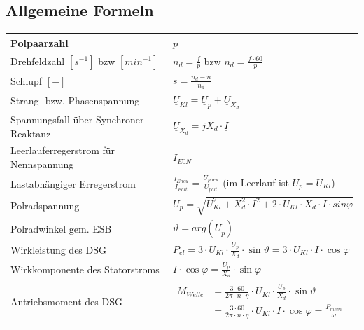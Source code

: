     \subsection{Allgemeine Formeln}
    \begin{tabular}[c]{ | p{7cm} | p{8cm} |}
    	\hline
    	Polpaarzahl	& $p$\\
    	\hline
    	Drehfeldzahl $[s^{-1}]$ bzw $[min^{-1}]$ & $n_d=\frac{f}{p}$ bzw
    	$n_d=\frac{f\cdot 60}{p}$\\
    	\hline
    	Schlupf $[-]$ & $s=\frac{n_d-n}{n_d}$\\
    	\hline
    	Strang- bzw. Phasenspannung &
    	$\underline{U}_{Kl}=\underline{U}_p+\underline{U}_{X_d}$\\
    	\hline
    	Spannungsfall über Synchroner Reaktanz & $\underline{U}_{X_d}=jX_d\cdot\underline{I}$\\
    	\hline
    	Leerlauferregerstrom für Nennspannung & $I_{E0N}$\\
    	\hline
    	Lastabhängiger Erregerstrom & $\frac{I_{Eneu}}{I_{Ealt}}=\frac{U_{pneu}}{U_{palt}}$ (im Leerlauf ist $U_p = U_{Kl}$)\\
    	\hline
    	Polradspannung & $U_p=\sqrt{U_{Kl}^2+X_d^2\cdot I^2+2\cdot U_{Kl}\cdot
    	X_d \cdot I\cdot sin \varphi}$\\
    	\hline
    	Polradwinkel gem. ESB & $\vartheta = arg(\underline{U}_p)$\\
    	\hline
    	Wirkleistung des DSG & $P_{el}=3\cdot
    	U_{Kl}\cdot\frac{U_p}{X_d}\cdot \sin\vartheta = 3 \cdot U_{Kl} \cdot I \cdot \cos{\varphi}$\\
    	\hline
    	Wirkkomponente des Statorstroms & $I \cdot \cos{\varphi} = \frac{U_p}{X_d} \cdot \sin{\varphi}$ \\
    	\hline
    	Antriebsmoment des DSG & $\begin{aligned}
    								M_{Welle} 	&=\frac{3\cdot60}{2\pi\cdot n \cdot
    								    				\eta}\cdot U_{Kl}\cdot\frac{U_p}{X_d}\cdot\sin\vartheta\\
    								    		&= \frac{3\cdot60}{2\pi\cdot n \cdot
    								    	    	\eta}\cdot U_{Kl}\cdot I \cdot \cos{\varphi}= \frac{P_{mech}}{\omega}
    								\end{aligned}$\\
    	\hline
    \end{tabular}

